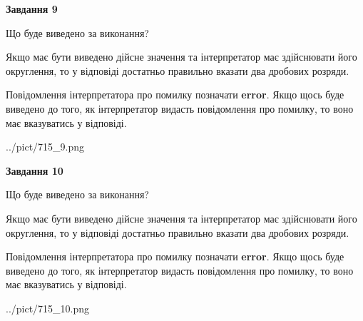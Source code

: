 \documentclass[12pt, ukrainian]{article}
\begin{document}
{\begin {Large}
{\begin {center}\textbf{Завдання 9}\end {center}}\par
Що буде виведено за виконання? \par

Якщо має бути виведено дійсне значення та інтерпретатор має здійснювати його округлення, 
то у відповіді достатньо правильно вказати два дробових розряди.

Повідомлення інтерпретатора про помилку позначати \textbf{error}.
Якщо щось буде виведено до того, як інтерпретатор видасть повідомлення про помилку, 
то воно має вказуватись у відповіді. \par

\begin{center}
	{../pict/715_9.png}
\end{center}
\newpage

{\begin {center}\textbf{Завдання 10}\end {center}}\par
Що буде виведено за виконання? \par

Якщо має бути виведено дійсне значення та інтерпретатор має здійснювати його округлення, 
то у відповіді достатньо правильно вказати два дробових розряди.

Повідомлення інтерпретатора про помилку позначати \textbf{error}.
Якщо щось буде виведено до того, як інтерпретатор видасть повідомлення про помилку, 
то воно має вказуватись у відповіді. \par

\begin{center}
	{../pict/715_10.png}
\end{center}
\newpage

\end {Large}}
\end{document}

